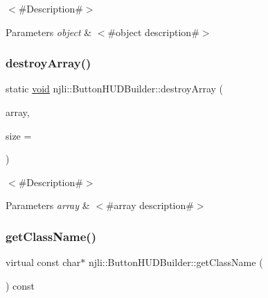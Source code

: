 $<$\#\+Description\#$>$


\begin{DoxyParams}{Parameters}
{\em object} & $<$\#object description\#$>$ \\
\hline
\end{DoxyParams}
\mbox{\label{classnjli_1_1_button_h_u_d_builder_aa092409e53e74ef1854920bedc7d74fe}} 
\subsubsection{\texorpdfstring{destroy\+Array()}{destroyArray()}}
{\footnotesize\ttfamily static \mbox{\hyperlink{_thread_8h_af1e856da2e658414cb2456cb6f7ebc66}{void}} njli\+::\+Button\+H\+U\+D\+Builder\+::destroy\+Array (\begin{DoxyParamCaption}\item[{\mbox{\hyperlink{classnjli_1_1_button_h_u_d_builder}{Button\+H\+U\+D\+Builder}} $\ast$$\ast$}]{array,  }\item[{const \mbox{\hyperlink{_util_8h_a10e94b422ef0c20dcdec20d31a1f5049}{u32}}}]{size = {} }\end{DoxyParamCaption})\hspace{0.3cm}{\ttfamily [static]}}

$<$\#\+Description\#$>$


\begin{DoxyParams}{Parameters}
{\em array} & $<$\#array description\#$>$ \\
\hline
\end{DoxyParams}
\mbox{\label{classnjli_1_1_button_h_u_d_builder_a8557df23bbea4d66c2281d81e120fd8e}} 
\subsubsection{\texorpdfstring{get\+Class\+Name()}{getClassName()}}
{\footnotesize\ttfamily virtual const char$\ast$ njli\+::\+Button\+H\+U\+D\+Builder\+::get\+Class\+Name (\begin{DoxyParamCaption}{ }\end{DoxyParamCaption}) const\hspace{0.3cm}{\ttfamily [virtual]}}


